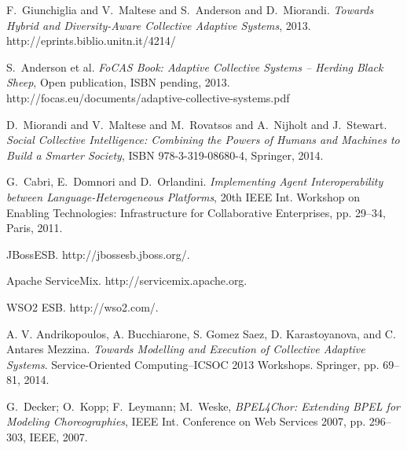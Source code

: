 \documentclass{llncs}
\begin{document}
%
%
%
\begin{thebibliography}{1}

F.~Giunchiglia and V.~Maltese and S.~Anderson and D.~Miorandi. \emph{Towards Hybrid and Diversity-Aware Collective Adaptive Systems}, 2013. http://eprints.biblio.unitn.it/4214/

S.~Anderson et al. \emph{FoCAS Book: Adaptive Collective Systems – Herding Black Sheep}, Open publication, ISBN pending, 2013. http://focas.eu/documents/adaptive-collective-systems.pdf

D.~Miorandi and V.~Maltese and M.~Rovatsos and A.~Nijholt and J.~Stewart. \emph{Social Collective Intelligence: Combining the Powers of Humans and Machines to Build a Smarter Society}, ISBN 978-3-319-08680-4, Springer, 2014.

G.~Cabri, E.~Domnori and D.~Orlandini. \emph{Implementing Agent Interoperability between Language-Heterogeneous Platforms}, 20th IEEE Int. Workshop on Enabling Technologies: Infrastructure for Collaborative Enterprises, pp. 29--34, Paris, 2011.

JBossESB. http://jbossesb.jboss.org/.

Apache ServiceMix. http://servicemix.apache.org.

WSO2 ESB. http://wso2.com/.

A. V. Andrikopoulos, A. Bucchiarone, S. Gomez Saez, D. Karastoyanova, and C. Antares Mezzina. \emph{Towards Modelling and Execution of Collective Adaptive Systems}. Service-Oriented Computing–ICSOC 2013 Workshops. Springer, pp. 69--81, 2014.

G.~Decker; O.~Kopp; F.~Leymann; M.~Weske, \emph{BPEL4Chor: Extending BPEL for Modeling Choreographies},  IEEE Int. Conference on Web Services 2007, pp. 296--303, IEEE, 2007.


\end{thebibliography}
\end{document}
